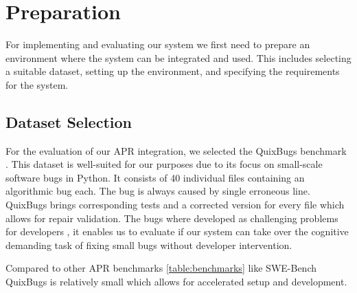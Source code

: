 \section{Preparation}
For implementing and evaluating our system we first need to prepare an environment where the system can be integrated and used. This includes selecting a suitable dataset, setting up the environment, and specifying the requirements for the system.
\subsection{Dataset Selection}
For the evaluation of our APR integration, we selected the QuixBugs benchmark \cite{linQuixBugsMultilingualProgram2017}. This dataset is well-suited for our purposes due to its focus on small-scale software bugs in Python. It consists of 40 individual files containing an algorithmic bug each. The bug is always caused by single erroneous line. QuixBugs brings corresponding tests and a corrected version for every file which allows for repair validation. The bugs where developed as challenging problems for developers \cite{linQuixBugsMultilingualProgram2017}, it enables us to evaluate if our system can take over the cognitive demanding task of fixing small bugs without developer intervention.

Compared to other APR benchmarks \ref{table:benchmarks} like SWE-Bench \cite{jimenezSWEbenchCanLanguage2024} QuixBugs is relatively small which allows for accelerated setup and development.

